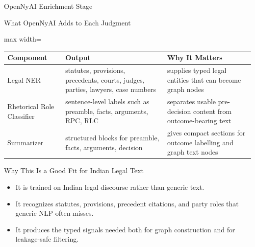 \documentclass[aspectratio=169,11pt]{beamer}
\newenvironment{tightitemize}{
  \begin{itemize}
    \setlength{\itemsep}{2pt}
    \setlength{\parskip}{0pt}
}{\end{itemize}}
\begin{document}
\begin{frame}{OpenNyAI Enrichment Stage}
  \scriptsize
  \begin{block}{What OpenNyAI Adds to Each Judgment}
    \begin{adjustbox}{max width=\textwidth}
      \begin{tabular}{p{2.4cm}p{4.0cm}p{5.0cm}}
        \toprule
        \textbf{Component} & \textbf{Output} & \textbf{Why It Matters} \\
        \midrule
        Legal NER & statutes, provisions, precedents, courts, judges, parties, lawyers, case numbers & supplies typed legal entities that can become graph nodes \\
        Rhetorical Role Classifier & sentence-level labels such as preamble, facts, arguments, RPC, RLC & separates usable pre-decision content from outcome-bearing text \\
        Summarizer & structured blocks for preamble, facts, arguments, decision & gives compact sections for outcome labelling and graph text nodes \\
        \bottomrule
      \end{tabular}
    \end{adjustbox}
  \end{block}
  \begin{block}{Why This Is a Good Fit for Indian Legal Text}
    \begin{tightitemize}
      \item It is trained on Indian legal discourse rather than generic text.
      \item It recognizes statutes, provisions, precedent citations, and party roles that generic NLP often misses.
      \item It produces the typed signals needed both for graph construction and for leakage-safe filtering.
    \end{tightitemize}
  \end{block}
\end{frame}
\end{document}
